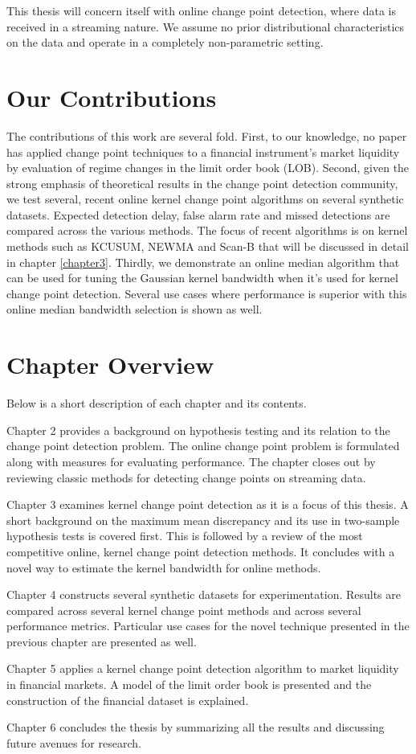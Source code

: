 This thesis will concern itself with online change point detection, where data is received in a streaming nature. We assume no prior distributional characteristics on the data and operate in a completely non-parametric setting. 


\section{Our Contributions}
The contributions of this work are several fold. First, to our knowledge, no paper has applied change point techniques to a financial instrument's market liquidity by evaluation of regime changes in the limit order book (LOB). Second, given the strong emphasis of theoretical results in the change point detection community, we test several, recent online kernel change point algorithms on several synthetic datasets. Expected detection delay, false alarm rate and missed detections are compared across the various methods. The focus of recent algorithms is on kernel methods such as KCUSUM, NEWMA and Scan-B that will be discussed in detail in chapter \ref{chapter3}. Thirdly, we demonstrate an online median algorithm that can be used for tuning the Gaussian kernel bandwidth when it's used for kernel change point detection. Several use cases where performance is superior with this online median bandwidth selection is shown as well. 

\section{Chapter Overview}
Below is a short description of each chapter and its contents. %

Chapter 2 provides a background on hypothesis testing and its relation to the change point detection problem. The online change point problem is formulated along with measures for evaluating performance. The chapter closes out by reviewing classic methods for detecting change points on streaming data.

Chapter 3 examines kernel change point detection as it is a focus of this thesis. A short background on the maximum mean discrepancy and its use in two-sample hypothesis tests is covered first. This is followed by a review of the most competitive online, kernel change point detection methods. It concludes with a novel way to estimate the kernel bandwidth for online methods.

Chapter 4 constructs several synthetic datasets for experimentation. Results are compared across several kernel change point methods and across several performance metrics. Particular use cases for the novel technique presented in the previous chapter are presented as well.

Chapter 5 applies a kernel change point detection algorithm to market liquidity in financial markets. A model of the limit order book is presented and the construction of the financial dataset is explained.

Chapter 6 concludes the thesis by summarizing all the results and discussing future avenues for research.
